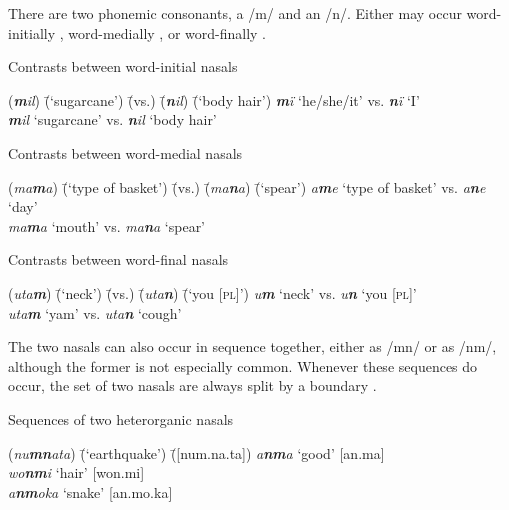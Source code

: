 There are two phonemic  consonants, a  /m/ and an  /n/. Either  may occur word-initially , word-medially , or word-finally .

\ea%
    \label{ex:phon:22}
          Contrasts between word-initial nasals\\
\begin{tabbing}
{(\textit{\textbf{m}il})} \= {(‘sugarcane’)} \= {(vs.)} \= {(\textit{\textbf{n}il})} \= {(‘body hair’)}\kill
{\textit{\textbf{m}ï}} \> {‘he/she/it’} \> {vs.} \> {\textit{\textbf{n}ï}} \> {‘I’}\\
{\textit{\textbf{m}il}} \> {‘sugarcane’} \> {vs.} \> {\textit{\textbf{n}il}} \> {‘body hair’}
\end{tabbing}
\z

\ea%
    \label{ex:phon:23}
          Contrasts between word-medial nasals\\
\begin{tabbing}
{(\textit{ma\textbf{m}a})} \= {(‘type of basket’)} \= {(vs.)} \= {(\textit{ma\textbf{n}a})} \= {(‘spear’)}\kill
{\textit{a\textbf{m}e}} \> {‘type of basket’} \> {vs.} \> {\textit{a\textbf{n}e}} \> {‘day’}\\
{\textit{ma\textbf{m}a}} \> {‘mouth’} \> {vs.} \> {\textit{ma\textbf{n}a}} \> {‘spear’}
\end{tabbing}
\z

\ea%
    \label{ex:phon:24}
          Contrasts between word-final nasals\\
\begin{tabbing}
{(\textit{uta\textbf{m}})} \= {(‘neck’)} \= {(vs.)} \= {(\textit{uta\textbf{n}})} \= {(‘you [\textsc{pl}]’)}\kill
{\textit{u\textbf{m}}} \> {‘neck’} \> {vs.} \> {\textit{u\textbf{n}}} \> {‘you [\textsc{pl}]’}\\
{\textit{uta\textbf{m}}} \> {‘yam’} \> {vs.} \> {\textit{uta\textbf{n}}} \> {‘cough’}
\end{tabbing}
 \z

The two nasals can also occur in sequence together, either as /mn/ or as /nm/, although the former is not especially common. Whenever these sequences do occur, the set of two nasals are always split by a  boundary .

\ea%
    \label{ex:phon:25}
          Sequences of two heterorganic nasals
          
    \ea  {[nm]}
\begin{tabbing}
{(\textit{nu\textbf{mn}ata})} \= {(‘earthquake’)} \= {([num.na.ta])}\kill
{\textit{a\textbf{nm}a}} \> {‘good’} \> {[an.ma]}\\
{\textit{wo\textbf{nm}i}} \> {‘hair’} \> {[won.mi]}\\
{\textit{a\textbf{nm}oka}} \> {‘snake’} \> {[an.mo.ka]}
\end{tabbing}

